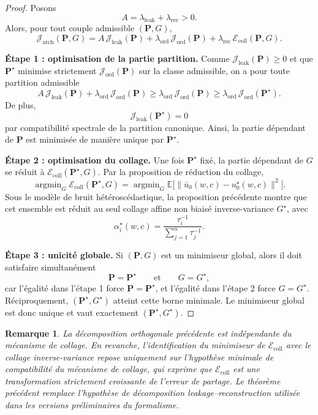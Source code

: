 \documentclass[11pt,a4paper]{article}
\newtheorem{remark}{Remarque}[section]
\DeclareMathOperator{\argmin}{argmin}
\newcommand{\1}{\mathbf 1}
\begin{document}
\begin{proof}
Posons
\[
A=\lambda_{\mathrm{leak}}+\lambda_{\mathrm{rec}}>0.
\]
Alors, pour tout couple admissible \((\mathbf P,G)\),
\[
\mathcal J_{\mathrm{arch}}(\mathbf P,G)
=
A\,\mathcal J_{\mathrm{leak}}(\mathbf P)
+
\lambda_{\mathrm{ord}}\,\mathcal J_{\mathrm{ord}}(\mathbf P)
+
\lambda_{\mathrm{rec}}\,\mathcal E_{\mathrm{coll}}(\mathbf P,G).
\]

\medskip
\noindent
\textbf{Étape 1 : optimisation de la partie partition.}
Comme \(\mathcal J_{\mathrm{leak}}(\mathbf P)\ge 0\) et que \(\mathbf P^\star\) minimise strictement \(\mathcal J_{\mathrm{ord}}(\mathbf P)\) sur la classe admissible, on a pour toute partition admissible
\[
A\,\mathcal J_{\mathrm{leak}}(\mathbf P)+\lambda_{\mathrm{ord}}\,\mathcal J_{\mathrm{ord}}(\mathbf P)
\ge
\lambda_{\mathrm{ord}}\,\mathcal J_{\mathrm{ord}}(\mathbf P)
\ge
\lambda_{\mathrm{ord}}\,\mathcal J_{\mathrm{ord}}(\mathbf P^\star).
\]
De plus,
\[
\mathcal J_{\mathrm{leak}}(\mathbf P^\star)=0
\]
par compatibilité spectrale de la partition canonique.
Ainsi, la partie dépendant de \(\mathbf P\) est minimisée de manière unique par \(\mathbf P^\star\).

\medskip
\noindent
\textbf{Étape 2 : optimisation du collage.}
Une fois \(\mathbf P^\star\) fixé, la partie dépendant de \(G\) se réduit à \(\mathcal E_{\mathrm{coll}}(\mathbf P^\star,G)\).
Par la proposition de réduction du collage,
\[
\argmin_G \mathcal E_{\mathrm{coll}}(\mathbf P^\star,G)
=
\argmin_G \mathbb E\bigl[\|\bar u_0(w,c)-u_0^\star(w,c)\|^2\bigr].
\]
Sous le modèle de bruit hétéroscédastique, la proposition précédente montre que cet ensemble est réduit au seul collage affine non biaisé inverse-variance \(G^\star\), avec
\[
\alpha_i^\star(w,c)=\frac{\tau_i^{-1}}{\sum_{j=1}^n\tau_j^{-1}}.
\]

\medskip
\noindent
\textbf{Étape 3 : unicité globale.}
Si \((\mathbf P,G)\) est un minimiseur global, alors il doit satisfaire simultanément
\[
\mathbf P=\mathbf P^\star
\qquad\text{et}\qquad
G=G^\star,
\]
car l'égalité dans l'étape 1 force \(\mathbf P=\mathbf P^\star\), et l'égalité dans l'étape 2 force \(G=G^\star\).
Réciproquement, \((\mathbf P^\star,G^\star)\) atteint cette borne minimale.
Le minimiseur global est donc unique et vaut exactement \((\mathbf P^\star,G^\star)\).
\end{proof}

\begin{remark}
La décomposition orthogonale précédente est indépendante du mécanisme de collage.
En revanche, l'identification du minimiseur de \(\mathcal E_{\mathrm{coll}}\) avec le collage inverse-variance repose uniquement sur l'hypothèse minimale de compatibilité du mécanisme de collage, qui exprime que \(\mathcal E_{\mathrm{coll}}\) est une transformation strictement croissante de l'erreur de partage.
Le théorème précédent remplace l'hypothèse de décomposition leakage--reconstruction utilisée dans les versions préliminaires du formalisme.
\end{remark}
\end{document}
